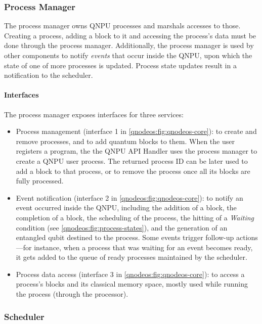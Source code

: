 \subsubsection{Process Manager}

The process manager owns \ac{QNPU} processes and marshals accesses to those. Creating a process, adding a block to it and accessing the process's data must be done through the process manager. Additionally, the process manager is used by other components to notify \emph{events} that occur inside the \ac{QNPU}, upon which the state of one of more processes is updated. Process state updates result in a notification to the scheduler.

\paragraph{Interfaces}

The process manager exposes interfaces for three services:
%
\begin{itemize}
\item Process management (interface 1 in \cref{qnodeos:fig:qnodeos-core}): to create and remove processes, and to add quantum blocks to them. When the user registers a program, the the \ac{QNPU} \ac{API} Handler uses the process manager to create a \ac{QNPU} user process. The returned process ID can be later used to add a block to that process, or to remove the process once all its blocks are fully processed.
\item Event notification (interface 2 in \cref{qnodeos:fig:qnodeos-core}): to notify an event occurred inside the \ac{QNPU}, including the addition of a block, the completion of a block, the scheduling of the process, the hitting of a \emph{Waiting} condition (see \cref{qnodeos:fig:process-states}), and the generation of an entangled qubit destined to the process. Some events trigger follow-up actions---for instance, when a process that was waiting for an event becomes ready, it gets added to the queue of ready processes maintained by the scheduler.
\item Process data access (interface 3 in \cref{qnodeos:fig:qnodeos-core}): to access a process's blocks and its classical memory space, mostly used while running the process (through the processor).
\end{itemize}

\subsubsection{Scheduler}

